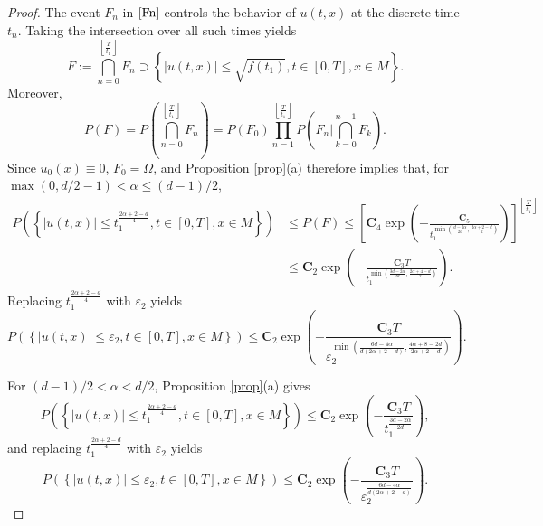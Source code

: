 \documentclass[10pt,a4paper]{amsart}
\begin{document}
\begin{proof}
The event $F_{n}$ in $\eqref{Fn}$ controls the behavior of $u(t,x)$ at the discrete time $t_n$. Taking the intersection over all such times yields
\[F:=\bigcap_{n=0}^{\left\lfloor\frac{T}{t_1}\right\rfloor}F_{n}\supset \left\lbrace\vert u(t,x)\vert\leq \sqrt{f(t_1)}, t\in[0,T],x\in M\right\rbrace.\]
Moreover,
\[P(F)=P\left(\bigcap_{n=0}^{\left\lfloor\frac{T}{t_1}\right\rfloor}F_{n}\right)=P(F_{0})\prod_{n=1}^{\left\lfloor\frac{T}{t_1}\right\rfloor}P\left(F_{n}\bigg| \bigcap_{k=0}^{n-1}F_{k}\right).\]
Since $u_0(x)\equiv 0$, $F_0=\Omega$, and Proposition \ref{prop}(a) therefore implies that, for $\max(0,d/2-1)<\alpha\leq(d-1)/2$,
\begin{align*}
P\left(\left\lbrace\vert u(t,x)\vert\leq t_1^\frac{2\alpha+2-d}{4}, t\in[0,T],x\in M\right\rbrace\right)&\leq P(F)\leq \left[\textbf{C}_4\exp\left(-\frac{\textbf{C}_5}{t_1^{\min\left(\frac{d-2\alpha}{2d},\frac{2\alpha+2-d}{2}\right)}}\right)\right]^{\left\lfloor\frac{T}{t_1}\right\rfloor}\\
&\leq \textbf{C}_2\exp\left(-\frac{\textbf{C}_3T}{t_1^{\min\left(\frac{3d-2\alpha}{2d},\frac{2\alpha+4-d}{2}\right)}}\right).
\end{align*}
Replacing $t_1^\frac{2\alpha+2-d}{4}$ with $\varepsilon_2$ yields
\begin{equation*}
P\left(\left\lbrace\vert u(t,x)\vert\leq \varepsilon_2, t\in[0,T],x\in M\right\rbrace\right)\leq\textbf{C}_2\exp\left(-\frac{\textbf{C}_3T}{\varepsilon_2^{\min\left(\frac{6d-4\alpha}{d(2\alpha+2-d)},\frac{4\alpha+8-2d}{2\alpha+2-d}\right)}}\right).
\end{equation*}

For $(d-1)/2<\alpha< d/2$, Proposition \ref{prop}(a) gives
\[
P\left(\left\lbrace\vert u(t,x)\vert\leq t_1^\frac{2\alpha+2-d}{4}, t\in[0,T],x\in M\right\rbrace\right)\leq\textbf{C}_2\exp\left(-\frac{\textbf{C}_3T}{t_1^{\frac{3d-2\alpha}{2d}}}\right),
\]
and replacing $t_1^\frac{2\alpha+2-d}{4}$ with $\varepsilon_2$ yields
\begin{equation*}
P\left(\left\lbrace\vert u(t,x)\vert\leq \varepsilon_2, t\in[0,T],x\in M\right\rbrace\right)\leq\textbf{C}_2\exp\left(-\frac{\textbf{C}_3T}{\varepsilon_2^{\frac{6d-4\alpha}{d(2\alpha+2-d)}}}\right).
\end{equation*}


\end{proof}
\end{document}
